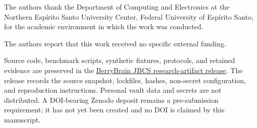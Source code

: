 \documentclass{sbc2023}
\begin{document}
\begin{acknowledgements}
The authors thank the Department of Computing and Electronics at the Northern Espírito Santo
University Center, Federal University of Espírito Santo, for the academic environment in which the
work was conducted.
\end{acknowledgements}

\begin{funding}
The authors report that this work received no specific external funding.
\end{funding}

\begin{materials}
Source code, benchmark scripts, synthetic fixtures, protocols, and retained evidence are preserved
in the \href{https://github.com/imsouza/berrybrain/releases/tag/jbcs-artifact-2026-08-25}{BerryBrain
JBCS research-artifact release}. The release records the source snapshot, lockfiles, hashes,
non-secret configuration, and reproduction instructions. Personal vault data and secrets are not
distributed. A DOI-bearing Zenodo deposit remains a pre-submission requirement; it has not yet been
created and no DOI is claimed by this manuscript.
\end{materials}

\balance


\end{document}
